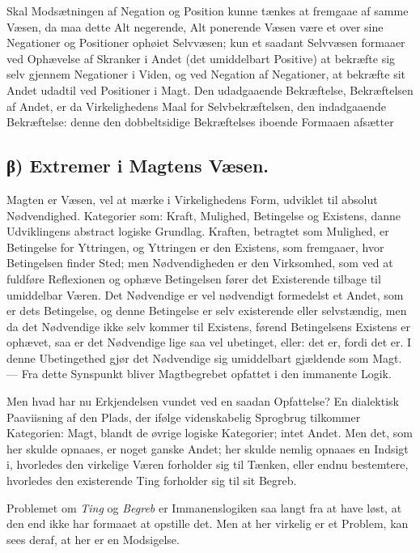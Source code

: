 \documentclass[12pt]{book}
\newcommand{\opage}[1]{\marginnote{\footnotesize\textit{[#1]}}}
\begin{document}
Skal Modsætningen af Negation og Position kunne
tænkes at fremgaae af samme Væsen, da maa dette Alt
negerende, Alt ponerende Væsen være et over sine Negationer
og Positioner ophøiet Selvvæsen; kun et saadant Selvvæsen
formaaer ved Ophævelse af Skranker i Andet (det
umiddelbart Positive) at bekræfte sig selv gjennem Negationer i
Viden, og ved Negation af Negationer, at bekræfte sit Andet
udadtil ved Positioner i Magt. Den udadgaaende
Bekræftelse, Bekræftelsen af Andet, er da Virkelighedens Maal for
Selvbekræftelsen, den indadgaaende Bekræftelse: denne den
dobbeltsidige Bekræftelses iboende Formaaen afsætter
\subsection*{β) Extremer i Magtens Væsen.}

Magten er
Væsen, vel at mærke i Virkelighedens Form, udviklet til
absolut Nødvendighed. Kategorier som: Kraft, Mulighed,
Betingelse og Existens, danne Udviklingens abstract logiske
Grundlag. Kraften, betragtet som Mulighed, er Betingelse
for Yttringen, og Yttringen er den Existens, som fremgaaer,
hvor Betingelsen finder Sted; men Nødvendigheden er den
Virksomhed, som ved at fuldføre Reflexionen og ophæve
Betingelsen fører det Existerende tilbage til umiddelbar Væren.
Det Nødvendige er vel nødvendigt formedelst et Andet, som
er dets Betingelse, og denne Betingelse er selv existerende
eller selvstændig, men da det Nødvendige ikke selv kommer
\opage{26} til Existens, førend Betingelsens Existens er ophævet, saa
er det Nødvendige lige saa vel ubetinget, eller: det er, fordi
det er. I denne Ubetingethed gjør det Nødvendige sig
umiddelbart gjældende som Magt. --- Fra dette Synspunkt bliver
Magtbegrebet opfattet i den immanente Logik.

Men hvad har nu Erkjendelsen vundet ved en saadan
Opfattelse? En dialektisk Paaviisning af den Plads, der
ifølge videnskabelig Sprogbrug tilkommer Kategorien: Magt,
blandt de øvrige logiske Kategorier; intet Andet. Men det,
som her skulde opnaaes, er noget ganske Andet; her skulde
nemlig opnaaes en Indsigt i, hvorledes den virkelige Væren
forholder sig til Tænken, eller endnu bestemtere, hvorledes
den existerende Ting forholder sig til sit Begreb.

Problemet om \emph{Ting} og \emph{Begreb} er
Immanenslogiken saa langt fra at have løst, at den end ikke har
formaaet at opstille det. Men at her virkelig er et Problem,
kan sees deraf, at her er en Modsigelse.
\end{document}
